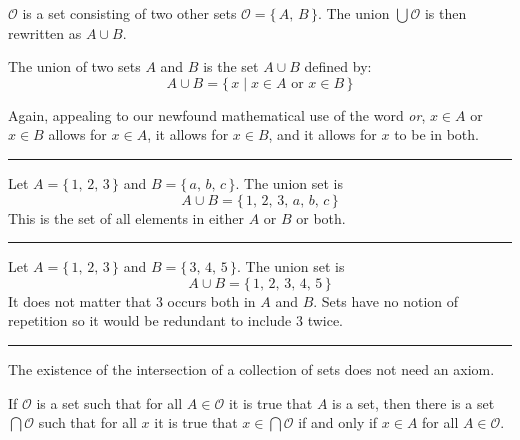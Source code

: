             $\mathcal{O}$ is a set consisting of two other sets
            $\mathcal{O}=\{\,A,\,B\,\}$. The union $\bigcup\mathcal{O}$ is then
            rewritten as $A\cup{B}$.
            \begin{definition}
                The union of two sets $A$ and $B$ is the set $A\cup{B}$ defined
                by:
                \begin{equation}
                    A\cup{B}=\{\,x\;|\;x\in{A}\textrm{ or }x\in{B}\,\}
                \end{equation}
            \end{definition}
            Again, appealing to our newfound mathematical use of the word
            \textit{or}, $x\in{A}$ or $x\in{B}$ allows for $x\in{A}$, it allows
            for $x\in{B}$, and it allows for $x$ to be in both.
            \par\hfill\par\hrule
            \begin{example}
                Let $A=\{\,1,\,2,\,3\,\}$ and $B=\{\,a,\,b,\,c\,\}$. The
                union set is
                \begin{equation}
                    A\cup{B}=\{\,1,\,2,\,3,\,a,\,b,\,c\,\}
                \end{equation}
                This is the set of all elements in either $A$ or $B$ or both.
            \end{example}
            \hrule
            \begin{example}
                Let $A=\{\,1,\,2,\,3\,\}$ and $B=\{\,3,\,4,\,5\,\}$. The union
                set is
                \begin{equation}
                    A\cup{B}=\{\,1,\,2,\,3,\,4,\,5\,\}
                \end{equation}
                It does not matter that $3$ occurs both in $A$ and $B$. Sets
                have no notion of repetition so it would be redundant to
                include $3$ twice.
            \end{example}
            \hrule\par\hfill\par
            The existence of the intersection of a collection of sets does
            not need an axiom.
            \begin{theorem}
                If $\mathcal{O}$ is a set such that for all $A\in\mathcal{O}$
                it is true that $A$ is a set, then there is a set
                $\bigcap\mathcal{O}$ such that for all $x$ it is true that
                $x\in\bigcap\mathcal{O}$ if and only if $x\in{A}$ for all
                $A\in\mathcal{O}$.
            \end{theorem}
